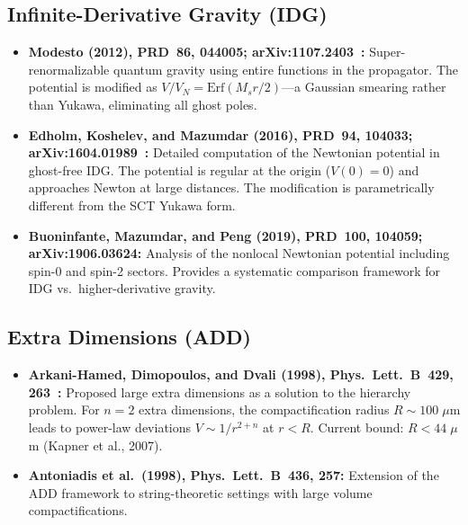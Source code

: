 \documentclass[11pt,a4paper]{article}
\begin{document}
\subsection{Infinite-Derivative Gravity (IDG)}

\begin{itemize}[leftmargin=2em]
  \item \textbf{Modesto (2012), PRD~86, 044005;
    arXiv:1107.2403~\cite{modesto2012}:}
    Super-renormalizable quantum gravity using entire functions in the
    propagator. The potential is modified as
    $V/V_N = \text{Erf}(M_s r/2)$---a Gaussian smearing rather than
    Yukawa, eliminating all ghost poles.

  \item \textbf{Edholm, Koshelev, and Mazumdar (2016), PRD~94, 104033;
    arXiv:1604.01989~\cite{edholm2016}:}
    Detailed computation of the Newtonian potential in ghost-free IDG.
    The potential is regular at the origin ($V(0) = 0$) and approaches
    Newton at large distances. The modification is parametrically different
    from the SCT Yukawa form.

  \item \textbf{Buoninfante, Mazumdar, and Peng (2019), PRD~100, 104059;
    arXiv:1906.03624:}
    Analysis of the nonlocal Newtonian potential including spin-0 and spin-2
    sectors. Provides a systematic comparison framework for IDG vs.\
    higher-derivative gravity.
\end{itemize}

\subsection{Extra Dimensions (ADD)}

\begin{itemize}[leftmargin=2em]
  \item \textbf{Arkani-Hamed, Dimopoulos, and Dvali (1998),
    Phys.\ Lett.\ B~429, 263~\cite{add1998}:}
    Proposed large extra dimensions as a solution to the hierarchy problem.
    For $n = 2$ extra dimensions, the compactification radius
    $R \sim 100\;\mu$m leads to power-law deviations $V \sim 1/r^{2+n}$ at
    $r < R$. Current bound: $R < 44\;\mu$m (Kapner et al., 2007).

  \item \textbf{Antoniadis et al.\ (1998), Phys.\ Lett.\ B~436, 257:}
    Extension of the ADD framework to string-theoretic settings with
    large volume compactifications.
\end{itemize}
\end{document}
